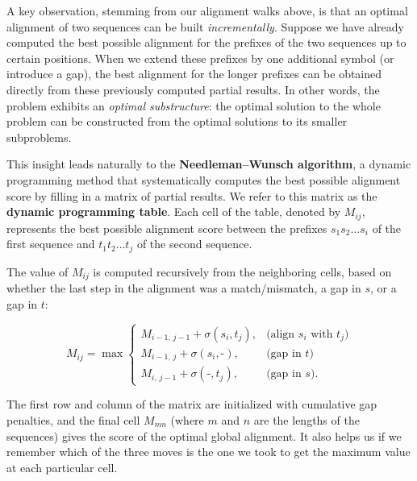 A key observation, stemming from our alignment walks above, is that an optimal alignment of two sequences can be built \emph{incrementally}. Suppose we have already computed the best possible alignment for the prefixes of the two sequences up to certain positions. When we extend these prefixes by one additional symbol (or introduce a gap), the best alignment for the longer prefixes can be obtained directly from these previously computed partial results. In other words, the problem exhibits an \emph{optimal substructure}: the optimal solution to the whole problem can be constructed from the optimal solutions to its smaller subproblems.

This insight leads naturally to the \textbf{Needleman–Wunsch algorithm}, 
a dynamic programming method that systematically computes the best possible alignment score by filling in a matrix of partial results. We refer to this matrix as the \textbf{dynamic programming table}. Each cell of the table, denoted by $M_{ij}$, represents the best possible alignment score between the prefixes $s_1 s_2 \ldots s_i$ of the first sequence and $t_1 t_2 \ldots t_j$ of the second sequence.

The value of $M_{ij}$ is computed recursively from the neighboring cells, based on whether the last step in the alignment was a match/mismatch, a gap in $s$, or a gap in $t$:

\[
M_{ij} = \max
\begin{cases}
M_{i-1,\,j-1} + \sigma(s_i, t_j), & \text{(align $s_i$ with $t_j$)}\\[6pt]
M_{i-1,\,j} + \sigma(s_i, \texttt{-}), & \text{(gap in $t$)}\\[6pt]
M_{i,\,j-1} + \sigma(\texttt{-}, t_j), & \text{(gap in $s$)}.
\end{cases}
\]

The first row and column of the matrix are initialized with cumulative gap penalties, and the final cell $M_{mn}$ (where $m$ and $n$ are the lengths of the sequences) gives the score of the optimal global alignment. It also helps us if we remember which of the three moves is the one we took to get the maximum value at each particular cell. 


